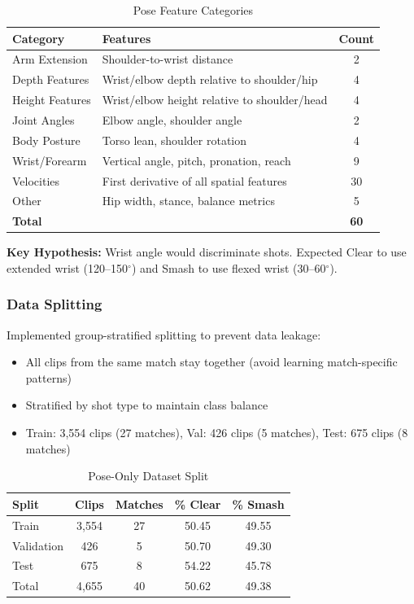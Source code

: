 \documentclass[12pt,a4paper]{article}
\begin{document}
\begin{table}[H]
\centering
\caption{Pose Feature Categories}
\begin{tabular}{llc}
\toprule
Category & Features & Count \\
\midrule
Arm Extension & Shoulder-to-wrist distance & 2 \\
Depth Features & Wrist/elbow depth relative to shoulder/hip & 4 \\
Height Features & Wrist/elbow height relative to shoulder/head & 4 \\
Joint Angles & Elbow angle, shoulder angle & 2 \\
Body Posture & Torso lean, shoulder rotation & 4 \\
Wrist/Forearm & Vertical angle, pitch, pronation, reach & 9 \\
Velocities & First derivative of all spatial features & 30 \\
Other & Hip width, stance, balance metrics & 5 \\
\midrule
\textbf{Total} & & \textbf{60} \\
\bottomrule
\end{tabular}
\end{table}

\textbf{Key Hypothesis:} Wrist angle would discriminate shots. Expected Clear to use extended wrist (120--150$^\circ$) and Smash to use flexed wrist (30--60$^\circ$).

\subsubsection{Data Splitting}

Implemented group-stratified splitting to prevent data leakage:

\begin{itemize}
\item All clips from the same match stay together (avoid learning match-specific patterns)
\item Stratified by shot type to maintain class balance
\item Train: 3,554 clips (27 matches), Val: 426 clips (5 matches), Test: 675 clips (8 matches)
\end{itemize}

\begin{table}[H]
\centering
\caption{Pose-Only Dataset Split}
\begin{tabular}{lcccc}
\toprule
Split & Clips & Matches & \% Clear & \% Smash \\
\midrule
Train & 3,554 & 27 & 50.45 & 49.55 \\
Validation & 426 & 5 & 50.70 & 49.30 \\
Test & 675 & 8 & 54.22 & 45.78 \\
\midrule
Total & 4,655 & 40 & 50.62 & 49.38 \\
\bottomrule
\end{tabular}
\end{table}
\end{document}
